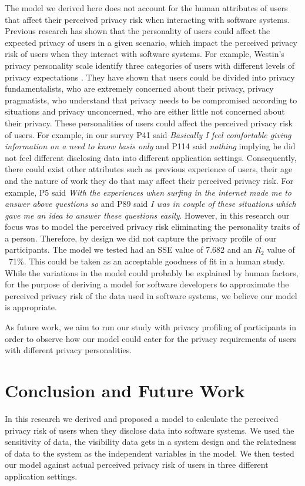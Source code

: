 \documentclass[conference]{IEEEtran}
\begin{document}
The model we derived here does not account for the human attributes of users that affect their perceived privacy risk when interacting with software systems. Previous research has shown that the personality of users could affect the expected privacy of users in a given scenario, which impact the perceived privacy risk of users when they interact with software systems. For example, Westin's privacy personality scale identify three categories of users with different levels of privacy expectations \cite {westin1991equifax}. They have shown that users could be divided into privacy fundamentalists, who are extremely concerned about their privacy, privacy pragmatists, who understand that privacy needs to be compromised according to situations and privacy unconcerned, who are either little not concerned about their privacy. These personalities of users could affect the perceived privacy risk of users. For example, in our survey P41 said \textit{Basically I feel comfortable giving information on a need to know basis only} and P114 said \textit {nothing} implying he did not feel different disclosing data into different application settings. Consequently, there could exist other attributes such as previous experience of users, their age and the nature of work they do that may affect their perceived privacy risk. For example, P5 said \textit{With the experiences when surfing in the internet made me to answer above questions so} and P89 said \textit {I was in couple of these situations which gave me an idea to answer these questions easily}. However, in this research our focus was to model the perceived privacy risk eliminating the personality traits of a person. Therefore, by design we did not capture the privacy profile of our participants. The model we tested had an SSE value of 7.682 and an $R_{2}$ value of ~71\%. This could be taken as an acceptable goodness of fit in a human study. While the variations in the model could probably be explained by human factors, for the purpose of deriving a model for software developers to approximate the perceived privacy risk of the data used in software systems, we believe our model is appropriate.

As future work, we aim to run our study with privacy profiling of participants in order to observe how our model could cater for the privacy requirements of users with different privacy personalities. 



\section{Conclusion and Future Work}
In this research we derived and proposed a model to calculate the perceived privacy risk of users when they disclose data into software systems. We used the sensitivity of data, the visibility data gets in a system design and the relatedness of data to the system as the independent variables in the model. We then tested our model against actual perceived privacy risk of users in three different application settings. 
\end{document}
